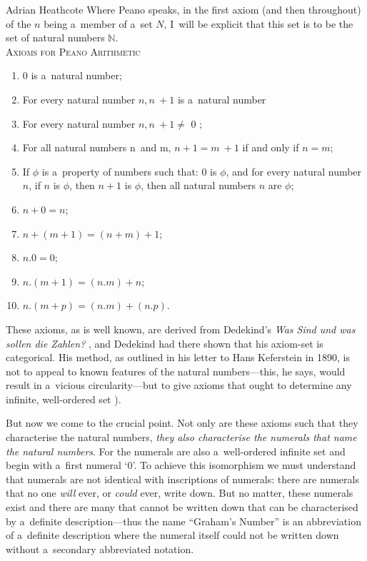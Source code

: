 \begin{artengenv}{Adrian Heathcote}
Where Peano speaks, in the first axiom (and then throughout) of the $n$ being a~member of a~set $N$, I~will be explicit that this set is to be the set of natural numbers $\mathbb{N}$. \\

\noindent\textsc{Axioms for Peano Arithmetic}

\begin{enumerate}[label=P\Roman* :]

  \item 0 is a~natural number;
  
  \item For every natural number $n, n~+ 1$ is a~natural number
  
  \item For every natural number $n, n~+ 1 \neq$ 0 ;
  
  \item For all natural numbers n~and m, $n + 1 = m~+ 1$ if and only if $n = m$;
  
  \item If $\phi$ is a~property of numbers such that: 0 is $\phi$, and for every natural number $n$, if $n$ is $\phi$, then $n + 1$ is $\phi$, then all natural numbers $n$ are $\phi$;
  
  \item $n + 0 = n$;
  
  \item $n + (m + 1) = (n + m) + 1$;
  
  \item $n . 0 = 0$;
  
  \item $n . (m + 1) =  (n . m) + n$;
  
  \item $n . (m + p) = (n . m) + (n . p)$.\\
\end{enumerate}

These axioms, as is well known, are derived from Dedekind's \textit{Was Sind und was sollen die Zahlen?} \parencite*{dedekind_was_1888}, and Dedekind had there shown that his axiom-set is categorical. His method, as outlined in his letter to Hans Keferstein in 1890, is not to appeal to known features of the natural numbers---this, he says, would result in a~vicious circularity---but to give axioms that ought to determine any infinite, well-ordered set \parencite{van_heijenoort_frege_1967}).

But now we come to the crucial point. Not only are these axioms such that they characterise the natural numbers, \emph{they also characterise the numerals that \emph{name} the natural numbers}. For the numerals are also a~well-ordered infinite set and begin with a~first numeral `0'. To achieve this isomorphism we must understand that numerals are not identical with inscriptions of numerals: there are numerals that no one \textit{will} ever, or \textit{could} ever, write down. But no matter, these numerals exist and there are many that cannot be written down that can be characterised by a~definite description---thus the name ``Graham's Number'' is an abbreviation of a~definite description where the numeral itself could not be written down without a~secondary abbreviated notation. 


\end{artengenv}
